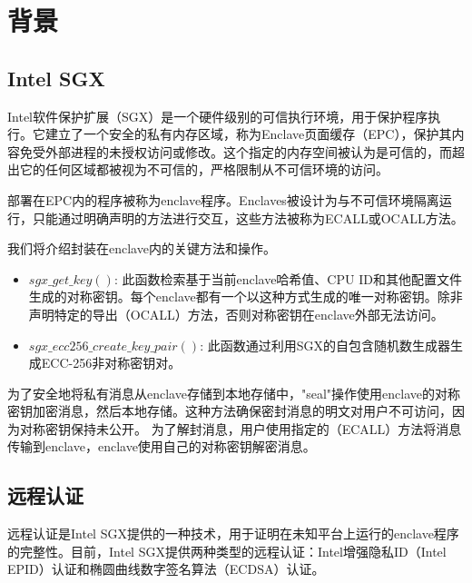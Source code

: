 \section{背景}
\subsection{Intel SGX}
Intel软件保护扩展（SGX）是一个硬件级别的可信执行环境，用于保护程序执行。它建立了一个安全的私有内存区域，称为Enclave页面缓存（EPC），保护其内容免受外部进程的未授权访问或修改。这个指定的内存空间被认为是可信的，而超出它的任何区域都被视为不可信的，严格限制从不可信环境的访问。

部署在EPC内的程序被称为enclave程序。Enclaves被设计为与不可信环境隔离运行，只能通过明确声明的方法进行交互，这些方法被称为ECALL或OCALL方法。

我们将介绍封装在enclave内的关键方法和操作。
\begin{itemize}
\item $sgx\_get\_key()$: 此函数检索基于当前enclave哈希值、CPU ID和其他配置文件生成的对称密钥。每个enclave都有一个以这种方式生成的唯一对称密钥。除非声明特定的导出（OCALL）方法，否则对称密钥在enclave外部无法访问。
\item $sgx\_ecc256\_create\_key\_pair()$: 此函数通过利用SGX的自包含随机数生成器生成ECC-256非对称密钥对。
\end{itemize}

为了安全地将私有消息从enclave存储到本地存储中，"seal"操作使用enclave的对称密钥加密消息，然后本地存储。这种方法确保密封消息的明文对用户不可访问，因为对称密钥保持未公开。
为了解封消息，用户使用指定的（ECALL）方法将消息传输到enclave，enclave使用自己的对称密钥解密消息。

\subsection{远程认证}
远程认证是Intel SGX提供的一种技术，用于证明在未知平台上运行的enclave程序的完整性。目前，Intel SGX提供两种类型的远程认证：Intel增强隐私ID（Intel EPID）认证和椭圆曲线数字签名算法（ECDSA）认证。


